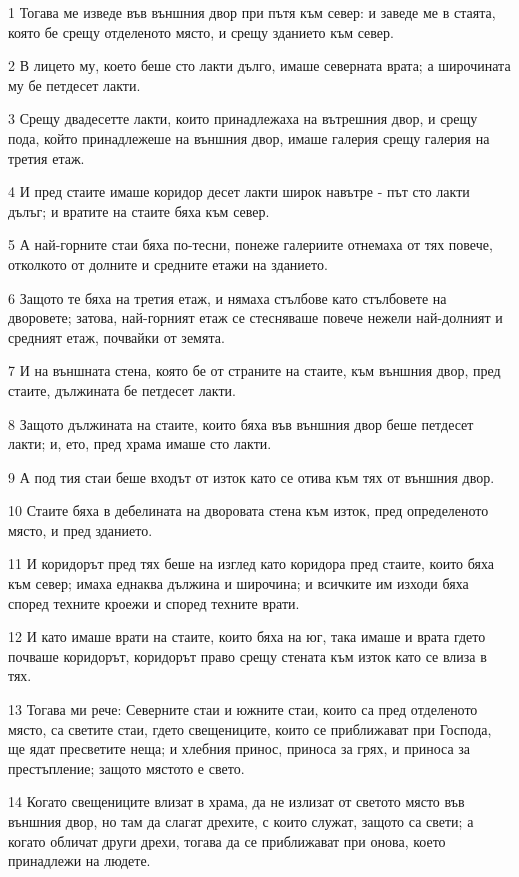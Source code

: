 \par 1 Тогава ме изведе във външния двор при пътя към север: и заведе ме в стаята, която бе срещу отделеното място, и срещу зданието към север.
\par 2 В лицето му, което беше сто лакти дълго, имаше северната врата; а широчината му бе петдесет лакти.
\par 3 Срещу двадесетте лакти, които принадлежаха на вътрешния двор, и срещу пода, който принадлежеше на външния двор, имаше галерия срещу галерия на третия етаж.
\par 4 И пред стаите имаше коридор десет лакти широк навътре - път сто лакти дълъг; и вратите на стаите бяха към север.
\par 5 А най-горните стаи бяха по-тесни, понеже галериите отнемаха от тях повече, отколкото от долните и средните етажи на зданието.
\par 6 Защото те бяха на третия етаж, и нямаха стълбове като стълбовете на дворовете; затова, най-горният етаж се стесняваше повече нежели най-долният и средният етаж, почвайки от земята.
\par 7 И на външната стена, която бе от страните на стаите, към външния двор, пред стаите, дължината бе петдесет лакти.
\par 8 Защото дължината на стаите, които бяха във външния двор беше петдесет лакти; и, ето, пред храма имаше сто лакти.
\par 9 А под тия стаи беше входът от изток като се отива към тях от външния двор.
\par 10 Стаите бяха в дебелината на дворовата стена към изток, пред определеното място, и пред зданието.
\par 11 И коридорът пред тях беше на изглед като коридора пред стаите, които бяха към север; имаха еднаква дължина и широчина; и всичките им изходи бяха според техните кроежи и според техните врати.
\par 12 И като имаше врати на стаите, които бяха на юг, така имаше и врата гдето почваше коридорът, коридорът право срещу стената към изток като се влиза в тях.
\par 13 Тогава ми рече: Северните стаи и южните стаи, които са пред отделеното място, са светите стаи, гдето свещениците, които се приближават при Господа, ще ядат пресветите неща; и хлебния принос, приноса за грях, и приноса за престъпление; защото мястото е свето.
\par 14 Когато свещениците влизат в храма, да не излизат от светото място във външния двор, но там да слагат дрехите, с които служат, защото са свети; а когато обличат други дрехи, тогава да се приближават при онова, което принадлежи на людете.
